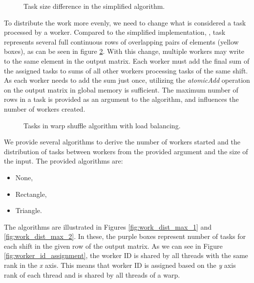 \begin{figure}[h]
	\centering
	\def\svgwidth{0.6\textwidth}
	
	\caption{Task size difference in the simplified algorithm.}
	\label{fig:warp_shuffle_work_difference}
\end{figure}

To distribute the work more evenly, we need to change what is considered a task processed by a worker. Compared to the simplified implementation, , task represents several full continuous rows of overlapping pairs of elements (yellow boxes), as can be seen in figure \ref{fig:warp_shuffle_work_dist_tasks}. With this change, multiple workers may write to the same element in the output matrix. Each worker must add the final sum of the assigned tasks to sums of all other workers processing tasks of the same shift. As each worker needs to add the sum just once, utilizing the \textit{atomicAdd} operation on the output matrix in global memory is sufficient. The maximum number of rows in a task is provided as an argument to the algorithm, and influences the number of workers created.

\begin{figure}[h]
	\centering
	\def\svgwidth{0.8\textwidth}
	
	\caption{Tasks in warp shuffle algorithm with load balancing.}
	\label{fig:warp_shuffle_work_dist_tasks}
\end{figure}


We provide several algorithms to derive the number of workers started and the distribution of tasks between workers from the provided argument and the size of the input. The provided algorithms are:

\begin{itemize}
	\item None,
	\item Rectangle,
	\item Triangle.
\end{itemize}


The algorithms are illustrated in Figures \ref{fig:work_dist_max_1} and \ref{fig:work_dist_max_2}. In these, the purple boxes represent number of tasks for each shift in the given row of the output matrix. As we can see in Figure \ref{fig:worker_id_assignment}, the worker ID is shared by all threads with the same rank in the \textit{x} axis. This means that worker ID is assigned based on the \textit{y} axis rank of each thread and is shared by all threads of a warp. 

